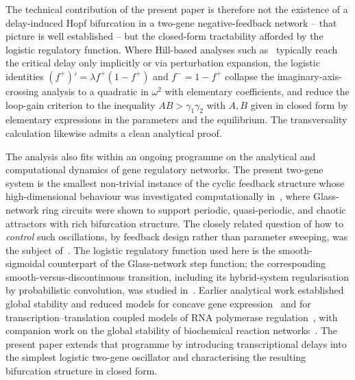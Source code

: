 \documentclass[sn-mathphys,Numbered]{sn-jnl}
\theoremstyle{thmstyleone}
\theoremstyle{thmstyletwo}
\theoremstyle{thmstylethree}
\begin{document}
The technical contribution of the present paper is therefore not the
existence of a delay-induced Hopf bifurcation in a two-gene
negative-feedback network -- that picture is well established -- but the
closed-form tractability afforded by the logistic regulatory function.
Where Hill-based analyses such as~\cite{xiao2008genetic,verdugo2008hopf}
typically reach the critical delay only implicitly or via perturbation
expansion, the logistic identities $(f^+)'=\lambda f^+(1-f^+)$ and
$f^-=1-f^+$ collapse the imaginary-axis-crossing analysis to a quadratic
in $\omega^2$ with elementary coefficients, and reduce the loop-gain
criterion to the inequality $AB>\gamma_1\gamma_2$ with $A,B$ given in
closed form by elementary expressions in the parameters and the
equilibrium. The transversality calculation likewise admits a clean
analytical proof.

The analysis also fits within an ongoing programme on the analytical and
computational dynamics of gene regulatory networks. The present two-gene
system is the smallest non-trivial instance of the cyclic feedback
structure whose high-dimensional behaviour was investigated
computationally in~\cite{belgacem2025computer,farcot2019chaos}, where
Glass-network ring circuits were shown to support periodic, quasi-periodic,
and chaotic attractors with rich bifurcation structure. The closely
related question of how to \emph{control} such oscillations, by feedback
design rather than parameter sweeping, was the subject
of~\cite{belgacem2021control,chambon2020qualitative}. The logistic
regulatory function used here is the smooth-sigmoidal counterpart of the
Glass-network step function; the corresponding smooth-versus-discontinuous
transition, including its hybrid-system regularisation by probabilistic
convolution, was studied in~\cite{belgacem2019probabilistic}. Earlier
analytical work established global stability and reduced models for
concave gene expression~\cite{belgacem2014mathematical} and for
transcription--translation coupled models of RNA polymerase
regulation~\cite{belgacem2018reduction,belgacem2014stability,belgacem2013stability,belgacem2013analysis},
with companion work on the global stability of biochemical reaction
networks~\cite{belgacem2013global,belgacem2012global}. The present paper
extends that programme by introducing transcriptional delays into the
simplest logistic two-gene oscillator and characterising the resulting
bifurcation structure in closed form.
\end{document}
